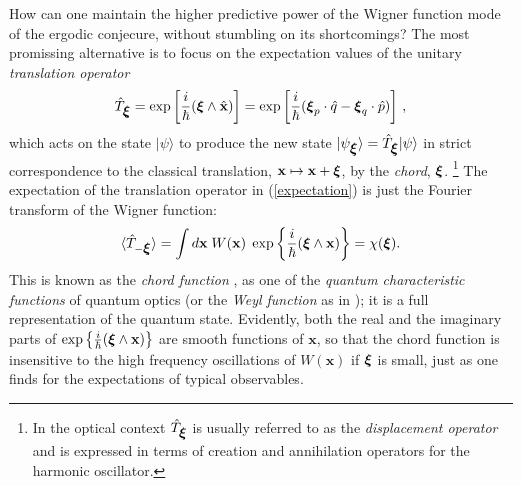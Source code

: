 \documentclass[12pt]{iopart}
\newcommand{\x}{{\mathbf x}}
\newcommand{\vct}[1]{\ensuremath\mbox{\boldmath$ #1 $}}
\newcommand{\Vxi}{\vct \xi}
\begin{document}
How can one maintain the higher predictive power of the Wigner function mode 
of the ergodic conjecure, without stumbling on its shortcomings? The most promissing alternative
is to focus on the expectation values of the unitary {\it translation operator}
\begin{equation}
\hat{T}_{\Vxi} = \exp{\left[\frac{i}{\hbar}(\Vxi\wedge \hat{\x})\right]}=
\exp{\left[\frac{i}{\hbar}(\Vxi_p\cdot \hat{q}-\Vxi_q\cdot \hat{p})\right]} \ ,
\end{equation}
which acts on the state $|\psi\rangle$ to produce the new state
$|\psi_{\Vxi}\rangle=\hat{T}_{\Vxi}|\psi\rangle$ in strict
correspondence to the classical translation, $\x \mapsto \x + \Vxi$,
by the {\it chord}, $\Vxi$.
%
\footnote{ In the optical context $\hat{T}_{\Vxi}$ is
usually referred to as the {\it displacement operator} and is
expressed in terms of creation and annihilation operators for the
harmonic oscillator.}
The expectation of the translation operator in (\ref{expectation}) 
is just the Fourier transform of the Wigner function:
\begin{equation}
\langle\hat{T}_{-\Vxi}\rangle = 
\int d\x \;W(\x)\; \exp\left\{\frac{i}{\hbar}(\Vxi\wedge \x)\right\} = \chi(\Vxi) .
\label{chift}
\end{equation}
This is known as the {\it chord function} \cite{OzReport}, 
as one of the {\it quantum characteristic functions} of quantum optics \cite{Leonhardt}
(or the {\it Weyl function} as in \cite{Chountasis}); 
it is a full representation of the quantum state.
Evidently, both the real and the imaginary parts of 
$\exp{\left\{\frac{i}{\hbar}(\Vxi\wedge \x)\right\}}$
are smooth functions of $\x$, so that the chord function is insensitive to the high
frequency oscillations of $W(\x)$ if $\Vxi$ is small, 
just as one finds for the expectations of typical observables.
\end{document}
